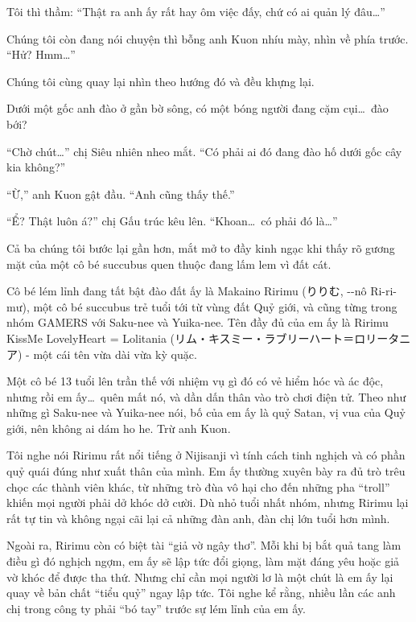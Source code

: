 \documentclass[../main.tex]{subfiles}
\begin{document}
Tôi thì thầm: ``Thật ra anh ấy rất hay ôm việc đấy, chứ có ai quản lý đâu\dots''

Chúng tôi còn đang nói chuyện thì bỗng anh Kuon nhíu mày, nhìn về phía trước. ``Hử? Hmm\dots''

Chúng tôi cùng quay lại nhìn theo hướng đó và đều khựng lại.

Dưới một gốc anh đào ở gần bờ sông, có một bóng người đang cặm cụi\dots\ đào bới?

``Chờ chút\dots'' chị Siêu nhiên nheo mắt. ``Có phải ai đó đang đào hố dưới gốc cây kia không?''

``Ừ,'' anh Kuon gật đầu. ``Anh cũng thấy thế.''

``Ể? Thật luôn á?'' chị Gấu trúc kêu lên. ``Khoan\dots\ có phải đó là\dots''

Cả ba chúng tôi bước lại gần hơn, mắt mở to đầy kinh ngạc khi thấy rõ gương mặt của một cô bé succubus quen thuộc đang lấm lem vì đất cát.

\chrint


Cô bé lém lỉnh đang tất bật đào đất ấy là Makaino Ririmu (りりむ, --nô Ri-ri-mư), một cô bé succubus trẻ tuổi tới từ vùng đất Quỷ giới, và cũng từng trong nhóm GAMERS với Saku-nee và Yuika-nee. Tên đầy đủ của em ấy là Ririmu KissMe LovelyHeart = Lolitania (リム・キスミー・ラブリーハート＝ロリータニア) - một cái tên vừa dài vừa kỳ quặc.

Một cô bé 13 tuổi lên trần thế với nhiệm vụ gì đó có vẻ hiểm hóc và ác độc, nhưng rồi em ấy\dots\ quên mất nó, và dần dấn thân vào trò chơi điện tử. Theo như những gì Saku-nee và Yuika-nee nói, bố của em ấy là quỷ Satan, vị vua của Quỷ giới, nên không ai dám ho he. Trừ anh Kuon.

Tôi nghe nói Ririmu rất nổi tiếng ở Nijisanji vì tính cách tinh nghịch và có phần quỷ quái đúng như xuất thân của mình. Em ấy thường xuyên bày ra đủ trò trêu chọc các thành viên khác, từ những trò đùa vô hại cho đến những pha ``troll'' khiến mọi người phải dở khóc dở cười. Dù nhỏ tuổi nhất nhóm, nhưng Ririmu lại rất tự tin và không ngại cãi lại cả những đàn anh, đàn chị lớn tuổi hơn mình.

Ngoài ra, Ririmu còn có biệt tài ``giả vờ ngây thơ''. Mỗi khi bị bắt quả tang làm điều gì đó nghịch ngợm, em ấy sẽ lập tức đổi giọng, làm mặt đáng yêu hoặc giả vờ khóc để được tha thứ. Nhưng chỉ cần mọi người lơ là một chút là em ấy lại quay về bản chất ``tiểu quỷ'' ngay lập tức. Tôi nghe kể rằng, nhiều lần các anh chị trong công ty phải ``bó tay'' trước sự lém lỉnh của em ấy.
\end{document}
